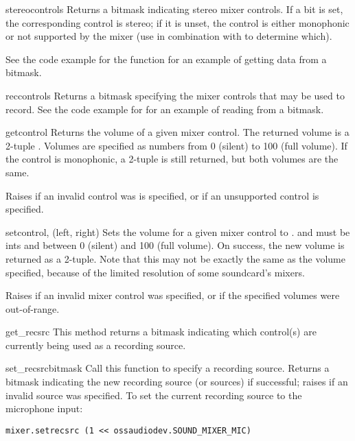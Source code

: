 \begin{methoddesc}{stereocontrols}{}
Returns a bitmask indicating stereo mixer controls.  If a bit is set,
the corresponding control is stereo; if it is unset, the control is
either monophonic or not supported by the mixer (use in combination with
 to determine which).

See the code example for the  function for an example
of getting data from a bitmask.
\end{methoddesc}

\begin{methoddesc}{reccontrols}{}
Returns a bitmask specifying the mixer controls that may be used to
record.  See the code example for  for an example of
reading from a bitmask.
\end{methoddesc}

\begin{methoddesc}{get}{control}
Returns the volume of a given mixer control.  The returned volume is a
2-tuple .  Volumes are specified as
numbers from 0 (silent) to 100 (full volume).  If the control is
monophonic, a 2-tuple is still returned, but both volumes are
the same.

Raises  if an invalid control was is specified,
or  if an unsupported control is specified.
\end{methoddesc}

\begin{methoddesc}{set}{control, (left, right)}
Sets the volume for a given mixer control to .
 and  must be ints and between 0 (silent) and 100
(full volume).  On success, the new volume is returned as a 2-tuple.
Note that this may not be exactly the same as the volume specified,
because of the limited resolution of some soundcard's mixers.

Raises  if an invalid mixer control was
specified, or if the specified volumes were out-of-range.
\end{methoddesc}

\begin{methoddesc}{get_recsrc}{}
This method returns a bitmask indicating which control(s) are
currently being used as a recording source.
\end{methoddesc}

\begin{methoddesc}{set_recsrc}{bitmask}
Call this function to specify a recording source.  Returns a bitmask
indicating the new recording source (or sources) if successful; raises
 if an invalid source was specified.  To set the current
recording source to the microphone input:

\begin{verbatim}
mixer.setrecsrc (1 << ossaudiodev.SOUND_MIXER_MIC)
\end{verbatim}
\end{methoddesc}



